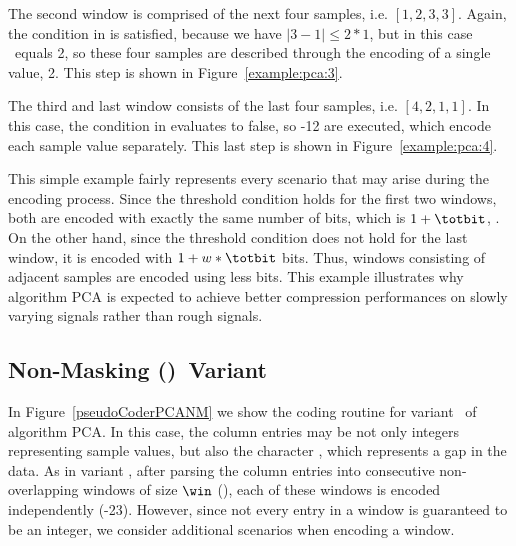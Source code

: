 \vspace{+5pt}


\clearpage


The second window is comprised of the next four samples, i.e. $[1, 2, 3, 3]$. Again, the condition in  is satisfied, because we have $|3 - 1| \leq 2*1$, but in this case \midrange\ equals 2, so these four samples are described through the encoding of a single value, 2. This step is shown in Figure~\ref{example:pca:3}.




The third and last window consists of the last four samples, i.e. $[4, 2, 1, 1]$. In this case, the condition in  evaluates to false, so -12 are executed, which encode each sample value separately. This last step is shown in Figure~\ref{example:pca:4}.


\vspace{+5pt}


This simple example fairly represents every scenario that may arise during the encoding process. Since the threshold condition holds for the first two windows, both are encoded with exactly the same number of bits, which is $1 + \totbit$, \wheretotbit. On the other hand, since the threshold condition does not hold for the last window, it is encoded with $1 + w*\totbit$ bits. Thus, windows consisting of adjacent samples are encoded using less bits. This example illustrates why algorithm PCA is expected to achieve better compression performances on slowly varying signals rather than rough signals.




\subsection{Non-Masking (\NOmaskalgo)\ Variant}
\label{algo:pca:nmvariant}


In Figure~\ref{pseudoCoderPCANM} we show the coding routine for variant \NOmaskalgo\ of algorithm PCA. In this case, the column entries may be not only integers representing sample values, but also the character \noData, which represents a gap in the data. As in variant \maskalgo, after parsing the column entries into consecutive non-overlapping windows of size $\win$ (), each of these windows is encoded independently (-23). However, since not every entry in a window is guaranteed to be an integer, we consider additional scenarios when encoding a window.


